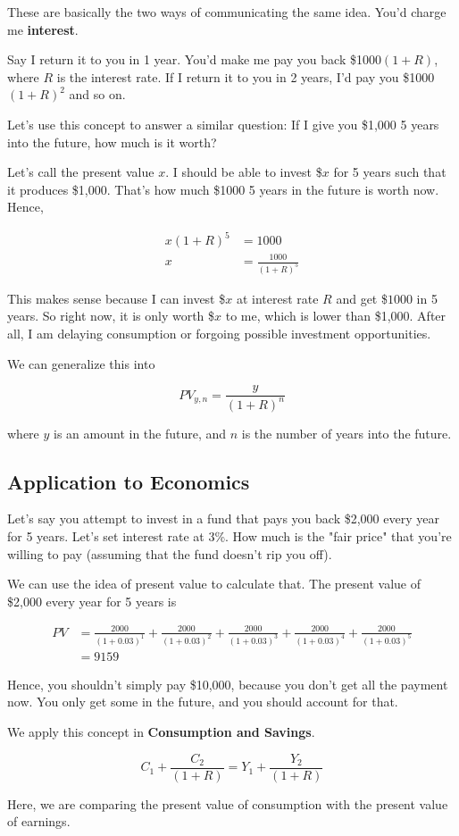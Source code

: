 \documentclass[11pt]{scrartcl}
\begin{document}
These are basically the two ways of communicating the same idea. You'd charge me \textbf{interest}.

Say I return it to you in 1 year. You'd make me pay you back \$1000$(1+R)$, where $R$ is the interest rate. If I return it to you in 2 years, I'd pay you \$1000$(1+R)^2$ and so on.

Let's use this concept to answer a similar question: If I give you \$1,000 5 years into the future, how much is it worth?

Let's call the present value $x$. I should be able to invest \$$x$ for 5 years such that it produces \$1,000. That's how much \$1000 5 years in the future is worth now. Hence,

\begin{align*}
x(1+R)^5 &= 1000 \\
x &= \frac{1000}{(1+R)^5}
\end{align*}

This makes sense because I can invest \$$x$ at interest rate $R$ and get \$$1000$ in 5 years. So right now, it is only worth \$$x$ to me, which is lower than \$1,000. After all, I am delaying consumption or forgoing possible investment opportunities.

We can generalize this into

\[ PV_{y,n} = \frac{y}{(1+R)^n} \]

where $y$ is an amount in the future, and $n$ is the number of years into the future.

\subsection{Application to Economics}
Let's say you attempt to invest in a fund that pays you back \$2,000 every year for 5 years. Let's set interest rate at 3\%. How much is the "fair price" that you're willing to pay (assuming that the fund doesn't rip you off). 

We can use the idea of present value to calculate that. The present value of \$2,000 every year for 5 years is

\begin{align*}
PV &= \frac{2000}{(1+0.03)^1} + \frac{2000}{(1+0.03)^2} + \frac{2000}{(1+0.03)^3} + \frac{2000}{(1+0.03)^4} + \frac{2000}{(1+0.03)^5} \\
&= 9159
\end{align*}

Hence, you shouldn't simply pay \$10,000, because you don't get all the payment now. You only get some in the future, and you should account for that.

We apply this concept in \textbf{Consumption and Savings}.

\[C_1 + \frac{C_2}{(1+R)} = Y_1 + \frac{Y_2}{(1+R)} \]

Here, we are comparing the present value of consumption with the present value of earnings.
\end{document}
